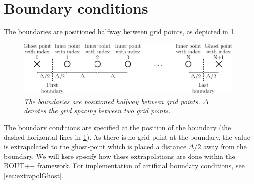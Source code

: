 \section{Boundary conditions}
%
The boundaries are positioned halfway between grid points, as depicted in \cref{fig:flatBC}.
%
\begin{figure}[htb]
    \centering
    \includegraphics[width=1.0\textwidth]{fig/flatGrid}
    \caption{\textit{
            The boundaries are positioned halfway between grid points.
            $\Delta$ denotes the grid spacing between two grid points.
        }}
    \label{fig:flatBC}
\end{figure}
%

\noindent
The boundary conditions are specified at the position of the boundary (the dashed horizontal lines in \cref{fig:flatBC}).
As there is no grid point at the boundary, the value is extrapolated to the ghost-point which is placed a distance $\Delta/2$ away from the boundary.
We will here specify how these extrapolations are done within the BOUT++ framework.
For implementation of artificial boundary conditions, see \cref{sec:extrapolGhost}.

